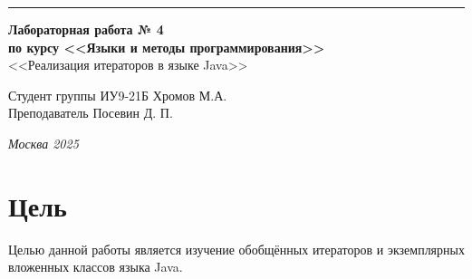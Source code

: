 \documentclass[a4paper, 14pt]{extarticle}
\begin{document}
\begin{titlepage}
\vspace*{-16pt}
\hspace{30pt}\rule{0.866\textwidth}{0.4pt}
  
\vspace{11em}

\begin{center}
\Large {\bf Лабораторная работа № 4} \\ 
\large {\bf по курсу <<Языки и методы программирования>>} \\ 
\large <<Реализация итераторов в языке Java>>
\end{center}\normalsize

\vspace{8em}


\begin{flushright}
  {Студент группы ИУ9-21Б Хромов М.А.\hspace*{15pt} \\
  \vspace{2ex}
  Преподаватель Посевин Д. П.\hspace*{15pt}}
\end{flushright}

\bigskip

\vfill
 

\begin{center}
\textsl{Москва 2025}
\end{center}
\end{titlepage}

\renewcommand{\ttdefault}{pcr}

\setlength{\tabcolsep}{3pt}
\newpage
\section{Цель}\label{Sect::task}
\par
Целью данной работы является изучение обобщённых итераторов и экземплярных вложенных классов языка Java.
\end{document}
